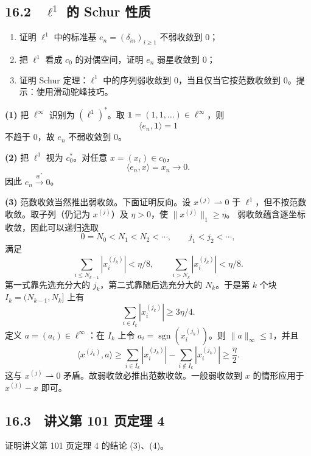 \subsection*{16.2　$\ell^1$ 的 Schur 性质}

\begin{problem}
\begin{enumerate}
 \item 证明 $\ell^1$ 中的标准基 $e_n=(\delta_{in})_{i\ge1}$ 不弱收敛到 $0$；
 \item 把 $\ell^1$ 看成 $c_0$ 的对偶空间，证明 $e_n$ 弱星收敛到 $0$；
 \item 证明 Schur 定理：$\ell^1$ 中的序列弱收敛到 $0$，当且仅当它按范数收敛到
 $0$。提示：使用滑动驼峰技巧。
\end{enumerate}
\end{problem}

\textbf{(1)} 把 $\ell^\infty$ 识别为 $(\ell^1)^*$。取
$\mathbf1=(1,1,\dots)\in\ell^\infty$，则
\[
 \langle e_n,\mathbf1\rangle=1
\]
不趋于 $0$，故 $e_n$ 不弱收敛到 $0$。

\textbf{(2)} 把 $\ell^1$ 视为 $c_0^*$。对任意 $x=(x_i)\in c_0$，
\[
 \langle e_n,x\rangle=x_n\to0.
\]
因此 $e_n\overset{w^*}\longrightarrow0$。

\textbf{(3)} 范数收敛当然推出弱收敛。下面证明反向。设
$x^{(j)}\rightharpoonup0$ 于 $\ell^1$，但不按范数收敛。取子列（仍记为
$x^{(j)}$）及 $\eta>0$，使 $\|x^{(j)}\|_1\ge\eta$。
弱收敛蕴含逐坐标收敛，因此可以递归选取
\[
 0=N_0<N_1<N_2<\cdots,\qquad j_1<j_2<\cdots,
\]
满足
\[
 \sum_{i\le N_{k-1}}|x_i^{(j_k)}|<\eta/8,\qquad
 \sum_{i>N_k}|x_i^{(j_k)}|<\eta/8.
\]
第一式靠先选充分大的 $j_k$，第二式靠随后选充分大的 $N_k$。于是第 $k$ 个块
$I_k=(N_{k-1},N_k]$ 上有
\[
 \sum_{i\in I_k}|x_i^{(j_k)}|\ge3\eta/4.
\]
定义 $a=(a_i)\in\ell^\infty$：在 $I_k$ 上令
$a_i=\operatorname{sgn}(x_i^{(j_k)})$。则 $\|a\|_\infty\le1$，并且
\[
 \langle x^{(j_k)},a\rangle
 \ge\sum_{i\in I_k}|x_i^{(j_k)}|
 -\sum_{i\notin I_k}|x_i^{(j_k)}|
 \ge\frac\eta2.
\]
这与 $x^{(j)}\rightharpoonup0$ 矛盾。故弱收敛必推出范数收敛。一般弱收敛到
$x$ 的情形应用于 $x^{(j)}-x$ 即可。

\subsection*{16.3　讲义第 101 页定理 4}

\begin{problem}
证明讲义第 101 页定理 4 的结论 (3)、(4)。
\end{problem}

